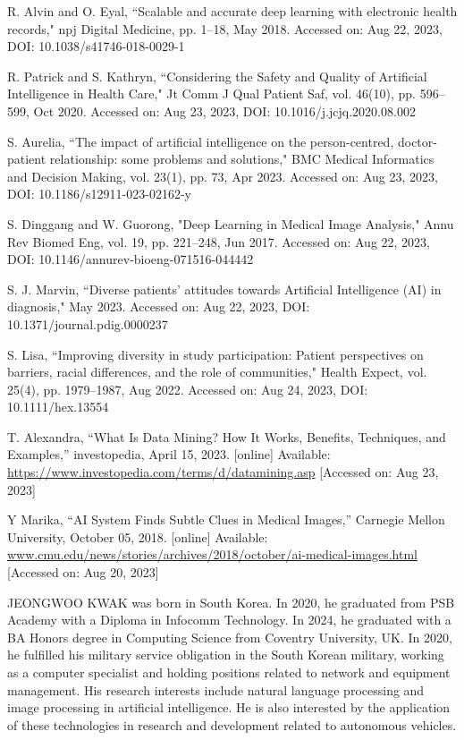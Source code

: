 \documentclass{ieeeaccess}
\begin{document}
\begin{thebibliography}{00}
 R. Alvin and O. Eyal, “Scalable and accurate deep learning with electronic health records," npj Digital Medicine, pp. 1–18, May 2018. Accessed on: Aug 22, 2023, DOI: 10.1038/s41746-018-0029-1


 R. Patrick and S. Kathryn, “Considering the Safety and Quality of Artificial Intelligence in Health Care," Jt Comm J Qual Patient Saf, vol. 46(10), pp. 596–599, Oct 2020. Accessed on: Aug 23, 2023, DOI: 10.1016/j.jcjq.2020.08.002

 S. Aurelia, “The impact of artificial intelligence on the person-centred, doctor-patient relationship: some problems and solutions," BMC Medical Informatics and Decision Making, vol. 23(1), pp. 73, Apr 2023. Accessed on: Aug 23, 2023, DOI: 10.1186/s12911-023-02162-y

 S. Dinggang and W. Guorong, "Deep Learning in Medical Image Analysis," Annu Rev Biomed Eng, vol. 19, pp. 221–248, Jun 2017. Accessed on: Aug 22, 2023, DOI: 10.1146/annurev-bioeng-071516-044442

 S. J. Marvin, “Diverse patients’ attitudes towards Artificial Intelligence (AI) in diagnosis," May 2023. Accessed on: Aug 22, 2023, DOI: 10.1371/journal.pdig.0000237

 S. Lisa, “Improving diversity in study participation: Patient perspectives on barriers, racial differences, and the role of communities," Health Expect, vol. 25(4), pp. 1979–1987, Aug 2022. Accessed on: Aug 24, 2023, DOI: 10.1111/hex.13554

 T. Alexandra, “What Is Data Mining? How It Works, Benefits, Techniques, and Examples,” investopedia, April 15, 2023. [online] 
Available: \underline{https://www.investopedia.com/terms/d/datamining.asp}
[Accessed on: Aug 23, 2023]


 Y Marika, “AI System Finds Subtle Clues in Medical Images,” Carnegie Mellon University, October 05, 2018. [online] Available: \underline{www.cmu.edu/news/stories/archives/2018/october/ai-medical-images.html} [Accessed on: Aug 20, 2023]

\end{thebibliography}

\begin{IEEEbiography}{JEONGWOO KWAK} was born in South Korea. In 2020, he graduated from PSB Academy with a Diploma in Infocomm Technology. In 2024, he graduated with a BA Honors degree in Computing Science from Coventry University, UK. In 2020, he fulfilled his military service obligation in the South Korean military, working as a computer specialist and holding positions related to network and equipment management. His research interests include natural language processing and image processing in artificial intelligence. He is also interested by the application of these technologies in research and development related to autonomous vehicles.
\end{IEEEbiography}

\EOD
\end{document}
